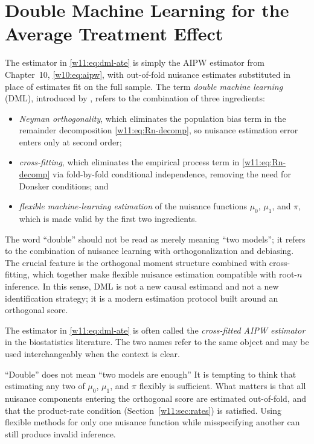 \documentclass[master.tex]{subfiles}
\begin{document}
\section{Double Machine Learning for the Average Treatment Effect}
\label{w11:sec:dml}

The estimator in \eqref{w11:eq:dml-ate} is simply the AIPW estimator
from Chapter~10, \eqref{w10:eq:aipw}, with out-of-fold nuisance
estimates substituted in place of estimates fit on the full sample.
The term \emph{double machine learning} (DML), introduced by
\citet{chernozhukov2018double}, refers to the combination of three
ingredients:
\begin{itemize}
  \item \emph{Neyman orthogonality}, which eliminates the
    population bias term in the remainder decomposition
    \eqref{w11:eq:Rn-decomp}, so nuisance estimation error
    enters only at second order;
  \item \emph{cross-fitting}, which eliminates the empirical
    process term in \eqref{w11:eq:Rn-decomp} via fold-by-fold
    conditional independence, removing the need for Donsker
    conditions; and
  \item \emph{flexible machine-learning estimation} of the
    nuisance functions $\mu_0$, $\mu_1$, and $\pi$, which is
    made valid by the first two ingredients.
\end{itemize}
The word ``double'' should not be read as merely meaning ``two
models''; it refers to the combination of nuisance learning with
orthogonalization and debiasing.  The crucial feature is the
orthogonal moment structure combined with cross-fitting, which
together make flexible nuisance estimation compatible with root-$n$
inference.  In this sense, DML is not a new causal estimand and not
a new identification strategy; it is a modern estimation protocol
built around an orthogonal score.

\begin{remark}
\label{w11:rem:cf-aipw}
The estimator in \eqref{w11:eq:dml-ate} is often called the
\emph{cross-fitted AIPW estimator} in the biostatistics literature.
The two names refer to the same object and may be used
interchangeably when the context is clear.
\end{remark}

\begin{warn}{``Double'' does not mean ``two models are enough''}
\label{w11:warn:double}
It is tempting to think that estimating any two of $\mu_0$,
$\mu_1$, and $\pi$ flexibly is sufficient.  What matters is that
all nuisance components entering the orthogonal score are estimated
out-of-fold, and that the product-rate condition
(Section~\ref{w11:sec:rates}) is satisfied.  Using flexible methods
for only one nuisance function while misspecifying another can still
produce invalid inference.
\end{warn}
\end{document}

